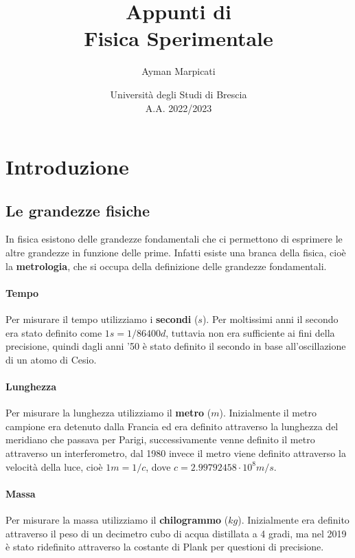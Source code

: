\documentclass[twoside]{report}
\title{\textbf{\Huge{Appunti di}\\Fisica Sperimentale}}
\author{\Large{Ayman Marpicati}}
\date{\normalsize{Università degli Studi di Brescia}\\A.A. 2022/2023}
\begin{document}
\maketitle
\cleardoublepage
\tableofcontents
\null\newpage

\setlength{\headheight}{15pt}

\pagestyle{fancy}
\fancyhead{} %
\fancyhead[LO]{\rightmark}
\fancyhead[RO]{\thepage}
\fancyhead[RE]{\leftmark}
\fancyhead[LE]{\thepage}
\fancyfoot{} %

\chapter{Introduzione}
\section{Le grandezze fisiche}
In fisica esistono delle grandezze fondamentali che ci permettono di esprimere le altre grandezze in funzione delle prime. Infatti esiste una branca della fisica, cioè la \textbf{metrologia}, che si occupa della definizione delle grandezze fondamentali.
\subsubsection{Tempo}
Per misurare il tempo utilizziamo i \textbf{secondi} (\(s\)). Per moltissimi anni il secondo era stato definito come \(1s = 1/86400 d\), tuttavia non era sufficiente ai fini della precisione, quindi dagli anni '50 è stato definito il secondo in base all'oscillazione di un atomo di Cesio.

\subsubsection{Lunghezza}
Per misurare la lunghezza utilizziamo il \textbf{metro} (\(m\)). Inizialmente il metro campione era detenuto dalla Francia ed era definito attraverso la lunghezza del meridiano che passava per Parigi, successivamente venne definito il metro attraverso un interferometro, dal 1980 invece il metro viene definito attraverso la velocità della luce, cioè \(1m = 1/c\), dove \(c = 2.99792458 \cdot 10^{8}m/s\).

\subsubsection{Massa}
Per misurare la massa utilizziamo il \textbf{chilogrammo} (\(kg\)). Inizialmente era definito attraverso il peso di un decimetro cubo di acqua distillata a 4 gradi, ma nel 2019 è stato ridefinito attraverso la costante di Plank per questioni di precisione.
\end{document}
